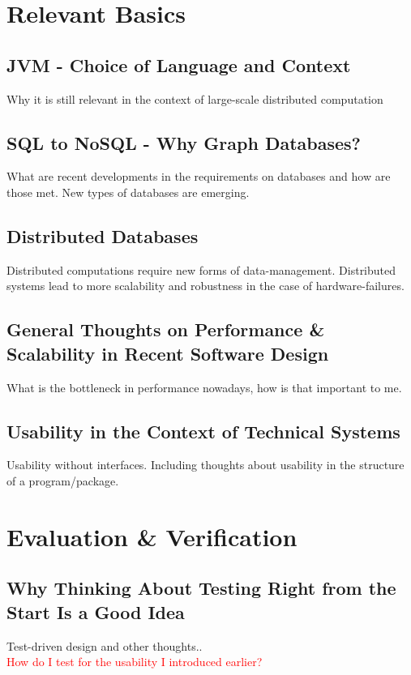\documentclass[11p]{scrartcl}
\begin{document}
\section{Relevant Basics}
\label{sec:basics}
\subsection{JVM - Choice of Language and Context}
\label{sec:jvm}
Why it is still relevant in the context of large-scale distributed computation
\subsection{SQL to NoSQL - Why Graph Databases?}
What are recent developments in the requirements on databases and how are those met. New types of databases are emerging.
\subsection{Distributed Databases}
Distributed computations require new forms of data-management. Distributed systems lead to more scalability and robustness in the case of hardware-failures.
\subsection{General Thoughts on Performance \& Scalability in Recent Software Design}
What is the bottleneck in performance nowadays, how is that important to me.

\subsection{Usability in the Context of Technical Systems}
Usability without interfaces. Including thoughts about usability in the structure of a program/package.



\section{Evaluation \& Verification}
\label{sec:evaluation}
\subsection{Why Thinking About Testing Right from the Start Is a Good Idea}
Test-driven design and other thoughts..\\
\textcolor{red}{How do I test for the usability I introduced earlier?}
\end{document}
